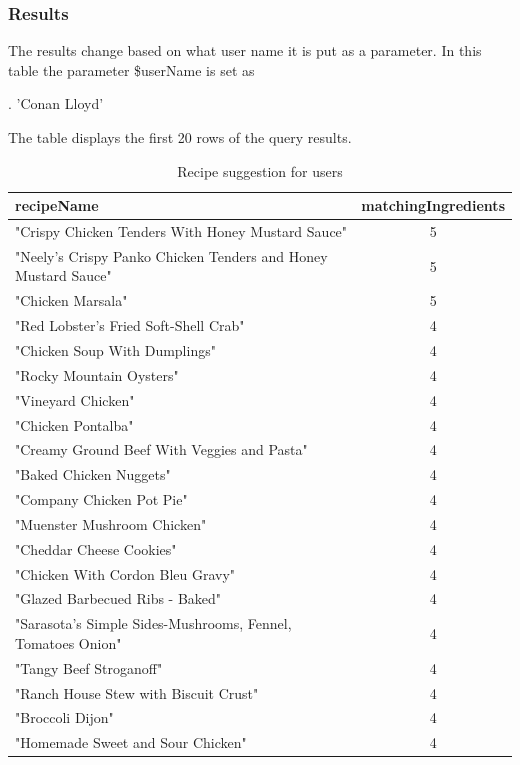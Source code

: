 \begin{enumerate}
    \subsubsection{Results}
The results change based on what user name it is put as a parameter. In this table the parameter \$userName is set as 
\begin{CypherQuery}
.
'Conan Lloyd'
\end{CypherQuery}
The table displays the first 20 rows of the query results.
    \begin{table}[h!]
\small %
\centering
\begin{tabularx}{\textwidth}{>{\raggedright\arraybackslash}Xc}
\toprule
\textbf{recipeName} & \textbf{matchingIngredients} \\
\midrule
"Crispy Chicken Tenders With Honey Mustard Sauce" & 5 \\
"Neely's Crispy Panko Chicken Tenders and Honey Mustard Sauce" & 5 \\
"Chicken Marsala" & 5 \\
"Red Lobster's Fried Soft-Shell Crab" & 4 \\
"Chicken Soup With Dumplings" & 4 \\
"Rocky Mountain Oysters" & 4 \\
"Vineyard Chicken" & 4 \\
"Chicken Pontalba" & 4 \\
"Creamy Ground Beef With Veggies and Pasta" & 4 \\
"Baked Chicken Nuggets" & 4 \\
"Company Chicken Pot Pie" & 4 \\
"Muenster Mushroom Chicken" & 4 \\
"Cheddar Cheese Cookies" & 4 \\
"Chicken With Cordon Bleu Gravy" & 4 \\
"Glazed Barbecued Ribs - Baked" & 4 \\
"Sarasota's Simple Sides-Mushrooms, Fennel, Tomatoes Onion" & 4 \\
"Tangy Beef Stroganoff" & 4 \\
"Ranch House Stew with Biscuit Crust" & 4 \\
"Broccoli Dijon" & 4 \\
"Homemade Sweet and Sour Chicken" & 4 \\
\bottomrule
\end{tabularx}
\caption{Recipe suggestion for users}
\label{tab:matching_ingredients}
\end{table}
    \clearpage

\end{enumerate}
